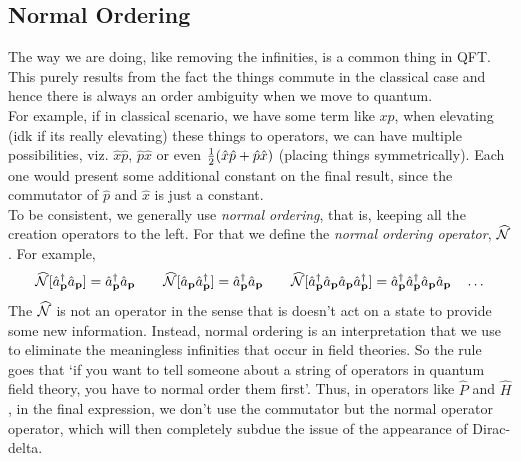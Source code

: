 \subsection{Normal Ordering}\label{sec:normalorder}
The way we are doing, like removing the infinities, is a common thing in QFT. This purely results from the fact the things commute in the classical case and hence there is always an order ambiguity when we move to quantum.\\[0.2cm]
For example, if in classical scenario, we have some term like $xp$, when elevating (idk if its really elevating) these things to operators, we can have multiple possibilities, viz. $\hat{x}\hat{p}$, $\hat{p}\hat{x}$ or even $\frac{1}{2}\qty(\hat{x}\hat{p} + \hat{p}\hat{x})$ (placing things symmetrically). Each one would present some additional constant on the final result, since the commutator of $\hat{p}$ and $\hat{x}$ is just a constant. \\[0.2cm]
To be consistent, we generally use \textit{normal ordering}, that is, keeping all the creation operators to the left. For that we define the \textit{normal ordering operator}, $\widehat{\mathcal N}$. For example,
$$\widehat{\mathcal N}[\hat{a}_{\vb{p}}^\dagger\hat{a}_{\vb{p}}] = \hat{a}_{\vb{p}}^\dagger\hat{a}_{\vb{p}}\qquad \widehat{\mathcal N}[\hat{a}_{\vb{p}}\hat{a}_{\vb{p}}^\dagger] = \hat{a}_{\vb{p}}^\dagger\hat{a}_{\vb{p}} \qquad \widehat{\mathcal N}[\hat{a}_{\vb{p}}^\dagger\hat{a}_{\vb{p}}\hat{a}_{\vb{p}}\hat{a}_{\vb{p}}^\dagger]=\hat{a}_{\vb{p}}^\dagger\hat{a}_{\vb{p}}^\dagger\hat{a}_{\vb{p}}\hat{a}_{\vb{p}} \quad \ldots$$
The $\widehat{\mathcal N}$ is not an operator in the sense that is doesn’t act on a state to provide some new information. Instead, normal ordering is an interpretation that we use to eliminate the meaningless infinities that occur in field theories. So the rule goes that `if you want to tell someone about
a string of operators in quantum field theory, you have to normal order them first'. Thus, in operators like $\hat{P}$ and $\hat{H}$, in the final expression, we don't use the commutator but the normal operator operator, which will then completely subdue the issue of the appearance of Dirac-delta.
